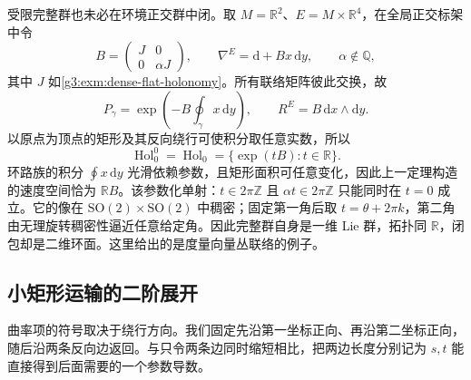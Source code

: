 \begin{example}\label{g3:exm:nonclosed-restricted-holonomy}
	受限完整群也未必在环境正交群中闭。取 \(M=\mathbb R^2\)、\(E=M\times\mathbb R^4\)，在全局正交标架中令
	\[
		B=\begin{pmatrix}J&0\\0&\alpha J\end{pmatrix},\qquad
		\nabla^E=\mathrm d+Bx\,\mathrm dy,
		\qquad \alpha\notin\mathbb Q,
	\]
	其中 \(J\) 如\cref{g3:exm:dense-flat-holonomy}。所有联络矩阵彼此交换，故
	\[
		P_\gamma=\exp\left(-B\oint_\gamma x\,\mathrm dy\right),\qquad
		R^E=B\,\mathrm dx\wedge\mathrm dy.
	\]
	以原点为顶点的矩形及其反向绕行可使积分取任意实数，所以
	\[
		\operatorname{Hol}_0^0=\operatorname{Hol}_0=\{\exp(tB):t\in\mathbb R\}.
	\]
	环路族的积分 \(\oint x\,\mathrm dy\) 光滑依赖参数，且矩形面积可任意变化，因此上一定理构造的速度空间恰为 \(\mathbb RB\)。该参数化单射：\(t\in2\pi\mathbb Z\) 且 \(\alpha t\in2\pi\mathbb Z\) 只能同时在 \(t=0\) 成立。它的像在 \(\mathrm{SO}(2)\times\mathrm{SO}(2)\) 中稠密；固定第一角后取 \(t=\theta+2\pi k\)，第二角由无理旋转稠密性逼近任意给定角。因此完整群自身是一维 Lie 群，拓扑同 \(\mathbb R\)，闭包却是二维环面。这里给出的是度量向量丛联络的例子。
\end{example}

\subsection{小矩形运输的二阶展开}
\label{g3:subsec:0501:04}

曲率项的符号取决于绕行方向。我们固定先沿第一坐标正向、再沿第二坐标正向，随后沿两条反向边返回。与只令两条边同时缩短相比，把两边长度分别记为 \(s,t\) 能直接得到后面需要的一个参数导数。

